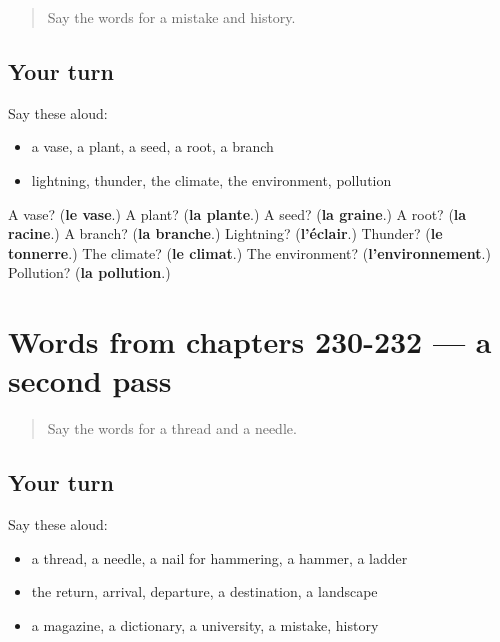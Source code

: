 \label{lesson:FR-R232-first-pass-words-from-chapters-228-229}



\begin{quote}
Say the words for a mistake and history.
\end{quote}

\subsection*{Your turn}
Say these aloud:

\begin{itemize}
\raggedright
  \item a vase, a plant, a seed, a root, a branch
  \item lightning, thunder, the climate, the environment, pollution
\end{itemize}

\begin{tcolorbox}[breakable,colback=teal!4,colframe=teal!35!black,title={Before you move on}]
A vase? (\textbf{le vase}.) A plant? (\textbf{la plante}.) A seed? (\textbf{la graine}.) A root? (\textbf{la racine}.) A branch? (\textbf{la branche}.) Lightning? (\textbf{l'éclair}.) Thunder? (\textbf{le tonnerre}.) The climate? (\textbf{le climat}.) The environment? (\textbf{l'environnement}.) Pollution? (\textbf{la pollution}.)
\end{tcolorbox}
\section[(dialogue)]{Words from chapters 230-232 — a second pass}

\label{lesson:FR-R232-second-pass-words-from-chapters-230-232}



\begin{quote}
Say the words for a thread and a needle.
\end{quote}

\subsection*{Your turn}
Say these aloud:

\begin{itemize}
\raggedright
  \item a thread, a needle, a nail for hammering, a hammer, a ladder
  \item the return, arrival, departure, a destination, a landscape
  \item a magazine, a dictionary, a university, a mistake, history
\end{itemize}

